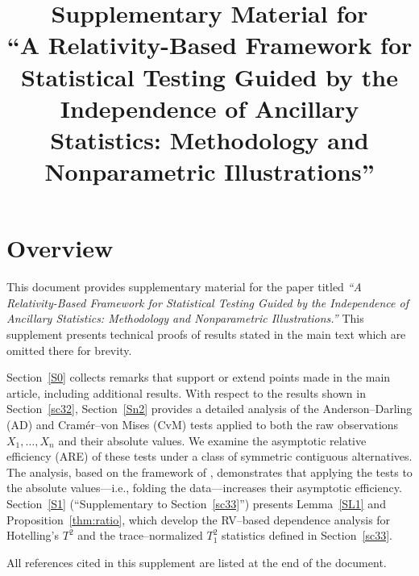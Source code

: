 \documentclass[12pt]{article}
\title{Supplementary Material for \\
	“A Relativity-Based Framework for Statistical Testing Guided by the Independence of Ancillary Statistics: Methodology and Nonparametric Illustrations”}
\author{}
\date{}
\theoremstyle{remark}
\theoremstyle{plain}
\begin{document}
	\renewcommand{\theequation}{S.\arabic{equation}}
	\setcounter{equation}{0}
	\renewcommand\thesection{S\arabic{section}}
	\renewcommand\thesubsection{S\arabic{section}.\arabic{subsection}}
	
	\maketitle


	\section*{Overview}	
		
	This document provides supplementary material for the paper titled \emph{“A Relativity-Based Framework for Statistical Testing Guided by the Independence of Ancillary Statistics: Methodology and Nonparametric Illustrations.”} This supplement presents technical proofs of results stated in the main text which are omitted there for brevity.
	
	Section~\ref{S0} 
	collects remarks that support or extend points made in the main article, including additional results.
		With respect to the results shown in Section~\ref{sc32}, Section~\ref{Sn2} provides a detailed analysis of the Anderson–Darling (AD) and Cramér–von Mises (CvM) tests applied to both the raw observations $X_1,\ldots,X_n$ and their absolute values. We examine the asymptotic relative efficiency (ARE) of these tests under a class of symmetric contiguous alternatives. The analysis, based on the framework of \citet{inglot2000vanishing}, demonstrates that applying the tests to the absolute values—i.e., folding the data—increases their asymptotic efficiency.		
	Section~\ref{S1} (“Supplementary to Section~\ref{sc33}”) presents Lemma~\ref{SL1} and Proposition~\ref{thm:ratio}, which develop the RV–based dependence analysis for Hotelling’s $T^2$ and the trace–normalized $T_1^2$ statistics defined in Section~\ref{sc33}. 
	 
	 	All references cited in this supplement are listed at the end of the document.
	
	
\end{document}
